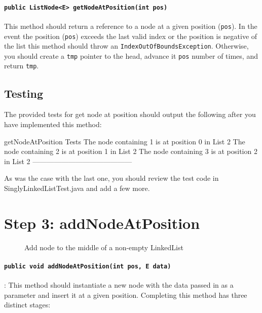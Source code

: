 \paragraph{\lstinline|public ListNode<E> getNodeAtPosition(int pos)|} This
method should return a reference to a node at a given position (\lstinline|pos|). In the event
the position (\lstinline|pos|) exceeds the last valid index or the position is
negative of the list this method should throw an
\lstinline|IndexOutOfBoundsException|. Otherwise, you should create a
\lstinline|tmp| pointer to the head, advance it \lstinline|pos| number of
times, and return \lstinline|tmp|.\\

\subsection*{Testing}
The provided tests for get node at position should output the following after you have implemented this method:
\begin{shell}
getNodeAtPosition Tests
The node containing 1 is at position 0 in List 2
The node containing 2 is at position 1 in List 2
The node containing 3 is at position 2 in List 2
------------------------------------------
\end{shell}
As was the case with the last one, you should review the test code in
SinglyLinkedListTest.java and add a few more.

\newpage

\section{Step 3: addNodeAtPosition}

\begin{figure}[H]

\caption{Add node to the middle of a non-empty LinkedList}
\label{fig:addtomiddle}
\end{figure}

\paragraph{\lstinline|public void addNodeAtPosition(int pos, E data)|}: This
method should instantiate a new node with the data passed in as a parameter
and insert it at a given position. Completing this method has three distinct
stages:\\

